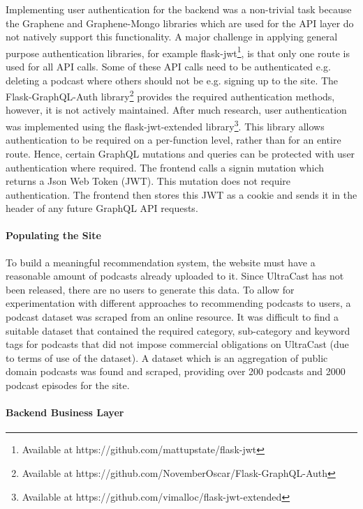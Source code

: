 \documentclass[../report.tex]{subfiles}
\begin{document}
Implementing user authentication for the backend was a non-trivial task because the Graphene and Graphene-Mongo libraries which are used for the API layer do not natively support this functionality.
A major challenge in applying general purpose authentication libraries, for example flask-jwt\footnote{Available at https://github.com/mattupstate/flask-jwt}, is that only one route is used for all API calls.
Some of these API calls need to be authenticated e.g. deleting a podcast where others should not be e.g. signing up to the site.
The Flask-GraphQL-Auth library\footnote{Available at https://github.com/NovemberOscar/Flask-GraphQL-Auth} provides the required authentication methods, however, it is not actively maintained.
After much research, user authentication was implemented using the flask-jwt-extended library\footnote{Available at https://github.com/vimalloc/flask-jwt-extended}.
This library allows authentication to be required on a per-function level, rather than for an entire route.
Hence, certain GraphQL mutations and queries can be protected with user authentication where required.
The frontend calls a signin mutation which returns a Json Web Token (JWT).
This mutation does not require authentication.
The frontend then stores this JWT as a cookie and sends it in the header of any future GraphQL API requests.

\paragraph{Populating the Site}

To build a meaningful recommendation system, the website must have a reasonable amount of podcasts already uploaded to it.
Since UltraCast has not been released, there are no users to generate this data.
To allow for experimentation with different approaches to recommending podcasts to users, a podcast dataset was scraped from an online resource.
It was difficult to find a suitable dataset that contained the required category, sub-category and keyword tags for podcasts that did not impose commercial obligations on UltraCast (due to terms of use of the dataset).
A dataset which is an aggregation of public domain podcasts was found and scraped, providing over 200 podcasts and 2000 podcast episodes for the site.

\paragraph{Backend Business Layer}
\end{document}
